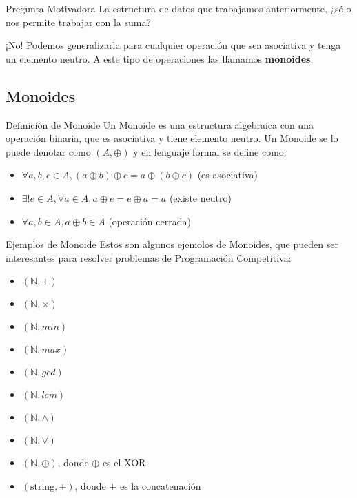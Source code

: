 \documentclass{beamer}
\begin{document}
\begin{frame}{Pregunta Motivadora}
La estructura de datos que trabajamos anteriormente, ¿sólo nos permite trabajar con la suma?

\pause
¡No! Podemos generalizarla para cualquier operación que sea asociativa y tenga un elemento neutro. A este tipo de operaciones las llamamos \textbf{monoides}.
\end{frame}

\subsection{Monoides}

\begin{frame}{Definición de Monoide}
Un Monoide es una estructura algebraica con una operación binaria, que es asociativa y tiene elemento neutro. Un Monoide se lo puede denotar como $(A, \oplus)$ y en lenguaje formal se define como:
\begin{itemize}
    \item $\forall a,b,c \in A, (a \oplus b) \oplus c = a \oplus (b \oplus c)$ (es asociativa)
    \item $\exists !e \in A, \forall a \in A, a \oplus e = e \oplus a = a$ (existe neutro)
    \item $\forall a,b \in A, a \oplus b \in A$ (operación cerrada)
\end{itemize}
\end{frame}

\begin{frame}{Ejemplos de Monoide}
Estos son algunos ejemolos de Monoides, que pueden ser interesantes para resolver problemas de Programación Competitiva:
\begin{itemize}
    \item $(\mathbb{N}, +)$
    \item $(\mathbb{N}, \times)$
    \item $(\mathbb{N}, min)$
    \item $(\mathbb{N}, max)$
    \item $(\mathbb{N}, gcd)$
    \item $(\mathbb{N}, lcm)$
    \item $(\mathbb{N}, \land)$
    \item $(\mathbb{N}, \lor)$
    \item $(\mathbb{N}, \oplus)$, donde $\oplus$ es el XOR
    \item $(\text{string}, +)$, donde $+$ es la concatenación
\end{itemize}
\end{frame}
\end{document}
